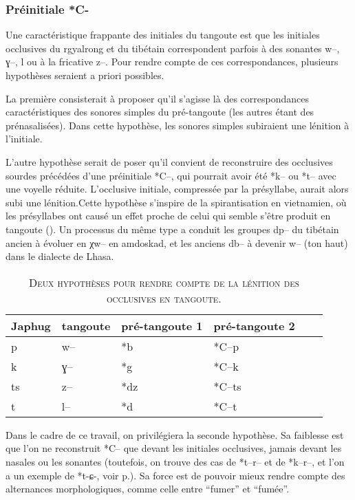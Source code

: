 \documentclass[oldfontcommands,twoside,a4paper,11pt,draft]{memoir}
\newcommand{\ipa}[1]{{\phon #1}} %
\newcommand{\ipapl}[1]{{\phondroit #1}}
\newcommand{\captionb}[1]{\caption{\textsc{#1}}}
\begin{document}
\subsubsection{Préinitiale *C-} \label{subsubsec:preinitialec}

Une caractéristique frappante des initiales du tangoute est que les initiales occlusives du rgyalrong et du tibétain correspondent parfois à des sonantes w--, \ipapl{ɣ--}, l ou à la fricative z--. Pour rendre compte de ces correspondances, plusieurs hypothèses seraient a priori possibles. 

La première consisterait à proposer qu'il s'agisse là des correspondances caractéristiques des sonores simples du pré-tangoute (les autres étant des prénasalisées). Dans cette hypothèse, les sonores simples subiraient une lénition à l'initiale. 

L'autre hypothèse serait de poser qu'il convient de reconstruire des occlusives sourdes précédées d'une préinitiale *C--, qui pourrait avoir été *k-- ou *t-- avec une voyelle réduite. L'occlusive initiale, compressée par la présyllabe, aurait alors subi une lénition.Cette hypothèse s'inspire de la spirantisation en vietnamien, où les présyllabes ont causé un effet proche de celui qui semble s'être produit en tangoute (\citealt{ferlus82spirantisation}). Un processus du même type a conduit les groupes dp-- du tibétain ancien à évoluer en \ipa{χw--} en amdoskad, et les anciens db-- à devenir w-- (ton haut) dans le dialecte de Lhasa.

\begin{table}
\captionb{Deux hypothèses pour rendre compte de la lénition des occlusives en tangoute.}\label{tab:hypotheseslenition}
\begin{tabular}{llllll} \toprule
	 Japhug	&tangoute&	pré-tangoute 1	& pré-tangoute 2 \\
\midrule
	p  	&	w--			&*b 		&	*C--p \\
	k 	&	\ipapl{ɣ--}	&*g	 	&*C--k \\
	ts 	&	z-- 			&*dz		& *C--ts \\
	t 	&	l--	 		&*d		& *C--t \\
\bottomrule
\end{tabular}
\end{table}

Dans le cadre de ce travail, on privilégiera la seconde hypothèse. Sa faiblesse est que l'on ne reconstruit *C-- que devant les initiales occlusives, jamais devant les nasales ou les sonantes (toutefois, on trouve des cas de *t--r-- et de *k--r--, et l'on a un exemple de *\ipapl{t-ɕ-}, voir p.\pageref{analyse:viande}). Sa force est de pouvoir mieux rendre compte des alternances morphologiques, comme celle entre ``fumer'' et ``fumée''.
\end{document}
